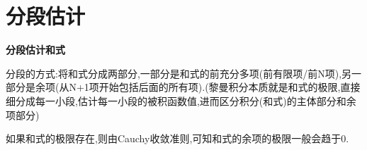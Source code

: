 \documentclass[../../main.tex]{subfiles}%
\begin{document}
\section{分段估计}

\begin{conclusion}
\textbf{分段估计和式}

分段的方式:将和式分成两部分,一部分是和式的前充分多项(前有限项/前N项),另一部分是余项(从N+1项开始包括后面的所有项).(黎曼积分本质就是和式的极限,直接细分成每一小段,估计每一小段的被积函数值,进而区分积分(和式)的主体部分和余项部分)
\end{conclusion}
\begin{note}
如果和式的极限存在,则由Cauchy收敛准则,可知和式的余项的极限一般会趋于0.
\end{note}
\end{document}
